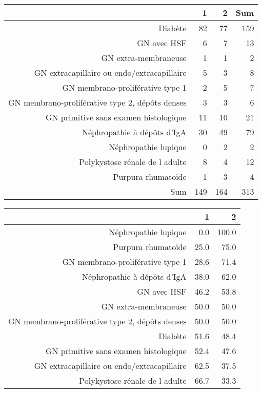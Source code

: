 \documentclass[11pt,a4paper]{article}\usepackage[]{graphicx}\usepackage[]{color}
\begin{document}
\begin{table}[H]
\centering
\begin{tabular}{rrrr}
  \hline
 & 1 & 2 & Sum \\ 
  \hline
Diabète & 82 & 77 & 159 \\ 
  GN avec HSF & 6 & 7 & 13 \\ 
  GN extra-membraneuse & 1 & 1 & 2 \\ 
  GN extracapillaire ou endo/extracapillaire & 5 & 3 & 8 \\ 
  GN membrano-proliférative type 1 & 2 & 5 & 7 \\ 
  GN membrano-proliférative type 2, dépôts denses & 3 & 3 & 6 \\ 
  GN primitive sans examen histologique & 11 & 10 & 21 \\ 
  Néphropathie à dépôts d'IgA & 30 & 49 & 79 \\ 
  Néphropathie lupique & 0 & 2 & 2 \\ 
  Polykystose rénale de l adulte & 8 & 4 & 12 \\ 
  Purpura rhumatoïde & 1 & 3 & 4 \\ 
  Sum & 149 & 164 & 313 \\ 
   \hline
\end{tabular}
\end{table}
\begin{table}[H]
\centering
\begin{tabular}{rrr}
  \hline
 & 1 & 2 \\ 
  \hline
Néphropathie lupique & 0.0 & 100.0 \\ 
  Purpura rhumatoïde & 25.0 & 75.0 \\ 
  GN membrano-proliférative type 1 & 28.6 & 71.4 \\ 
  Néphropathie à dépôts d'IgA & 38.0 & 62.0 \\ 
  GN avec HSF & 46.2 & 53.8 \\ 
  GN extra-membraneuse & 50.0 & 50.0 \\ 
  GN membrano-proliférative type 2, dépôts denses & 50.0 & 50.0 \\ 
  Diabète & 51.6 & 48.4 \\ 
  GN primitive sans examen histologique & 52.4 & 47.6 \\ 
  GN extracapillaire ou endo/extracapillaire & 62.5 & 37.5 \\ 
  Polykystose rénale de l adulte & 66.7 & 33.3 \\ 
   \hline
\end{tabular}
\end{table}
\end{document}
